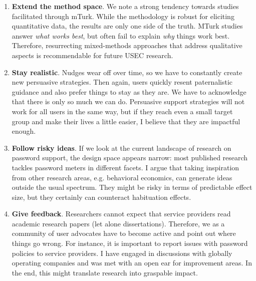 \begin{enumerate}
	\item \textbf{Extend the method space}. \label{recommendation:method_space}We note a strong tendency towards studies facilitated through \gls{mTurk}. While the methodology is robust for eliciting quantitative data, the results are only one side of the truth. MTurk studies answer \textit{what works best}, but often fail to explain \textit{why} things work best. Therefore, resurrecting mixed-methods approaches that address qualitative aspects is recommendable for future USEC research. 
	
	\item \textbf{Stay realistic}. Nudges wear off over time, so we have to constantly create new persuasive strategies. Then again, users quickly resent paternalistic guidance and also prefer things to stay as they are. We have to acknowledge that there is only so much we can do. Persuasive support strategies will not work for all users in the same way, but if they reach even a small target group and make their lives a little easier, I believe that they are impactful enough. %
	
	\item \textbf{Follow risky ideas}. If we look at the current landscape of research on password support, the design space appears narrow: most published research tackles password meters in different facets. I argue that taking inspiration from other research areas, e.g. behavioral economics, can generate ideas outside the usual spectrum. They might be risky in terms of predictable effect size, but they certainly can counteract habituation effects. 
	
	
	\item \textbf{Give feedback}. Researchers cannot expect that service providers read academic research papers (let alone dissertations). Therefore, we as a community of user advocates have to become active and point out where things go wrong. For instance, it is important to report issues with password policies to service providers. I have engaged in discussions with globally operating companies and was met with an open ear for improvement areas. In the end, this might translate research into graspable impact. 
	
\end{enumerate}


